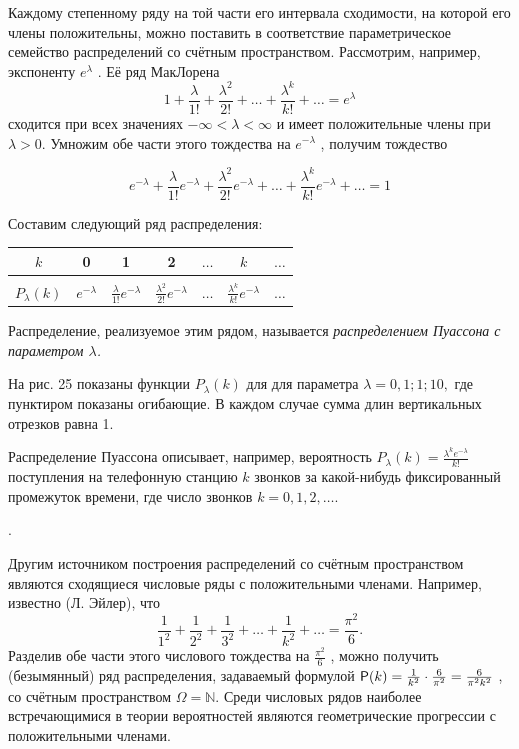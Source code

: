 \begin{zam}
	\label{zam:4.14}
Каждому степенному ряду на той части его интервала
сходимости, на которой его члены положительны, можно поставить в соответствие параметрическое семейство распределений со счётным пространством.
Рассмотрим, например, экспоненту $e^\lambda$ . Её ряд МакЛорена
$$1+ \frac{\lambda}{1!} + \frac{\lambda^2}{2!} + \ldots + \frac{\lambda^k}{k!} + \ldots = e^\lambda$$
сходится при всех значениях $−\infty < \lambda < \infty$ и имеет положительные члены при $\lambda > 0$. Умножим обе части этого тождества на $e^{−\lambda}$ , получим тождество

$$e^{−\lambda}+ \frac{\lambda}{1!} e^{−\lambda} + \frac{\lambda^2}{2!} e^{−\lambda}+ \ldots + \frac{\lambda^k}{k!} e^{−\lambda} + \ldots= 1$$

Составим следующий ряд распределения:

\begin{center}
	\begin{tabular}{|c|c|c|c|c|c|c|}
		\hline
		$k$ 			& 0 								& 1 				  & 2 & $\ldots$ & $k$ 		& $\ldots$ \\ \hline
		&&&&&& \\[-1em] 
		$P_\lambda(k)$  & $e^{-\lambda}$ & $\frac{\lambda}{1!}e^{-\lambda}$ & $\frac{\lambda^2}{2!}e^{-\lambda}$ & $\ldots$ & $\frac{\lambda^k}{k!}e^{-\lambda}$& $\ldots$ \\[1ex] \hline
	\end{tabular}
\end{center}
\end{zam}

\begin{definition}
	\label{def:4.15}
Распределение, реализуемое этим рядом, называется \textit{распределением Пуассона с параметром $\lambda$.}

На рис. 25 показаны функции $P_\lambda (k)$ для для параметра $\lambda = 0, 1; 1; 10,$ где
пунктиром показаны огибающие. В каждом случае сумма длин вертикальных отрезков равна 1.

Распределение Пуассона описывает, например, вероятность $P_\lambda (k) = \frac{\lambda^k e^{-\lambda}}{k!}$
поступления на телефонную станцию $k$ звонков за какой-нибудь фиксированный промежуток времени, где число звонков $k = 0, 1, 2, \ldots$.
\end{definition}. 
\begin{zam}
	\label{zam:4.16}
Другим источником построения распределений со счётным пространством являются сходящиеся числовые ряды с положительными членами. Например, известно (Л. Эйлер), что
$$\frac{1}{1^2} + \frac{1}{2^2} + \frac{1}{3^2} + \ldots + \frac{1}{k^2} + \ldots = \frac{\pi^2}{6}.$$
Разделив обе части этого числового тождества на $\frac{\pi^2}{6}$ , можно получить (безымянный) ряд распределения, задаваемый формулой $\P(k) = \frac{1}{k^2} \cdot \frac{6}{\pi^2} = \frac{6}{\pi^2 k^2}$ , со счётным пространством $\Omega = \mathbb{N}$.
Среди числовых рядов наиболее встречающимися в теории вероятностей являются геометрические прогрессии с положительными членами.
\end{zam}

